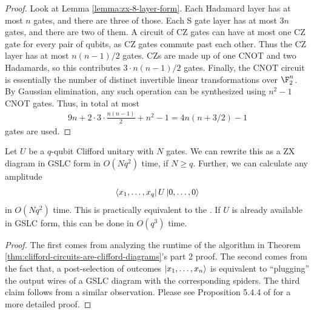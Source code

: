\begin{proof}
Look at Lemma \ref{lemma:zx-8-layer-form}. Each Hadamard layer has at most $n$ gates, and there are three of those. Each S gate layer has at most $3n$ gates, and there are two of them. A circuit of CZ gates can have at most one CZ gate for every pair of qubits, as CZ gates commute past each other. Thus the CZ layer has at most $n(n-1)/2$ gates. CZs are made up of one CNOT and two Hadamards, so this contributes $3 \cdot n(n-1)/2$ gates. Finally, the CNOT circuit is essentially the number of distinct invertible linear transformations over $\F_2^n$. By Gaussian elimination, any such operation can be synthesized using $n^2 - 1$ CNOT gates. Thus, in total at most 
\begin{align}
    9n + 2 \cdot 3 \cdot \frac{n(n-1)}{2} + n^2 - 1 = 4n(n + 3/2) - 1
\end{align}
gates are used.
\end{proof}

\begin{theorem}
\label{thm:Gottesman-Knill}
Let $U$ be a $q$-qubit Clifford unitary with $N$ gates. We can rewrite this as a ZX diagram in GSLC form in $O(Nq^2)$ time, if $N \geq q$. Further, we can calculate any amplitude 
\begin{align}
    \bra{x_1, \ldots, x_q} U \ket{0, \ldots, 0}
\end{align}
in $O(Nq^2)$ time. This is practically equivalent to the . If $U$ is already available in GSLC form, this can be done in $O(q^3)$ time.
\end{theorem}

\begin{proof}
The first comes from analyzing the runtime of the algorithm in Theorem \ref{thm:clifford-circuits-are-clifford-diagrams}'s part 2 proof. The second comes from the fact that, a post-selection of outcomes $\ket{x_1, \ldots, x_n}$ is equivalent to ``plugging'' the output wires of a GSLC diagram with the corresponding spiders. The third claim follows from a similar observation. Please see Proposition 5.4.4 of \cite{PQS} for a more detailed proof. 
\end{proof}